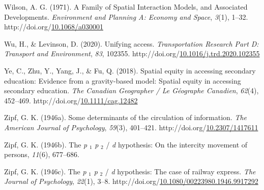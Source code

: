 \documentclass[
11pt, %
oneside, %
english, %
singlespacing, %
]{macthesis} %
\newlength{\cslhangindent}
\newenvironment{CSLReferences}[2] %
{\begin{list}{}{%
	\setlength{\itemindent}{0pt}
	\setlength{\leftmargin}{0pt}
	\setlength{\parsep}{0pt}
	\ifodd #1
	\setlength{\leftmargin}{\cslhangindent}
	\setlength{\itemindent}{-1\cslhangindent}
	\fi
	\setlength{\itemsep}{#2\baselineskip}}}
{\end{list}}
\begin{document}
\begin{CSLReferences}{1}{0}
Wilson, A. G. (1971). A Family of Spatial Interaction Models, and Associated Developments. \emph{Environment and Planning A: Economy and Space}, \emph{3}(1), 1--32. http://doi.org/\href{https://doi.org/10.1068/a030001}{10.1068/a030001}

Wu, H., \& Levinson, D. (2020). Unifying access. \emph{Transportation Research Part D: Transport and Environment}, \emph{83}, 102355. http://doi.org/\href{https://doi.org/10.1016/j.trd.2020.102355}{10.1016/j.trd.2020.102355}

Ye, C., Zhu, Y., Yang, J., \& Fu, Q. (2018). Spatial equity in accessing secondary education: {Evidence} from a gravity-based model: {Spatial} equity in accessing secondary education. \emph{The Canadian Geographer / Le Géographe Canadien}, \emph{62}(4), 452--469. http://doi.org/\href{https://doi.org/10.1111/cag.12482}{10.1111/cag.12482}

Zipf, G. K. (1946a). Some determinants of the circulation of information. \emph{The American Journal of Psychology}, \emph{59}(3), 401--421. http://doi.org/\href{https://doi.org/10.2307/1417611}{10.2307/1417611}

Zipf, G. K. (1946b). The \emph{p} \(_{\textrm{1}}\) \emph{p} \(_{\textrm{2}}\) / \emph{d} hypothesis: On the intercity movement of persons, \emph{11}(6), 677--686.

Zipf, G. K. (1946c). The \emph{p} \(_{\textrm{1}}\) \emph{p} \(_{\textrm{2}}\) / \emph{d} hypothesis: The case of railway express. \emph{The Journal of Psychology}, \emph{22}(1), 3--8. http://doi.org/\href{https://doi.org/10.1080/00223980.1946.9917292}{10.1080/00223980.1946.9917292}

\end{CSLReferences}
\end{document}
